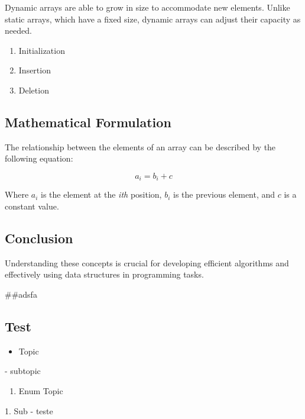 Dynamic arrays are able to grow in size to accommodate new elements. Unlike static arrays, which have a fixed size, dynamic arrays can adjust their capacity as needed.

\begin{enumerate}
	\item Initialization
	\item Insertion
	\item Deletion
\end{enumerate}

\subsection*{Mathematical Formulation}

The relationship between the elements of an array can be described by the following equation:

\[
a_i = b_i + c
\]

Where $a_i$ is the element at the \textit{ith} position, $b_i$ is the previous element, and $c$ is a constant value.

\subsection*{Conclusion}

Understanding these concepts is crucial for developing efficient algorithms and effectively using data structures in programming tasks.

\hrulefill

##adsfa

\subsection*{Test}

\begin{itemize}
	\item Topic
\end{itemize}

    - subtopic

\begin{enumerate}
	\item Enum Topic
\end{enumerate}

    1. Sub
        - teste
